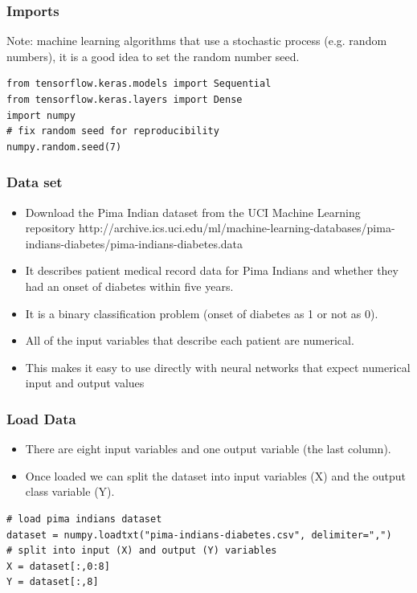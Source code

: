 \begin{frame}[fragile] \frametitle{Imports}
Note: machine learning algorithms that use a stochastic process (e.g. random numbers), it is a good idea to set the random number seed.
\begin{lstlisting}
from tensorflow.keras.models import Sequential
from tensorflow.keras.layers import Dense
import numpy
# fix random seed for reproducibility
numpy.random.seed(7)
\end{lstlisting}
\end{frame}

\begin{frame}[fragile] \frametitle{Data set}
 \begin{itemize}
 \item  Download the Pima Indian dataset from the UCI Machine Learning repository http://archive.ics.uci.edu/ml/machine-learning-databases/pima-indians-diabetes/pima-indians-diabetes.data 
\item  It describes patient medical record data for Pima Indians and whether they had an onset of diabetes within five years.
\item  It is a binary classification problem (onset of diabetes as 1 or not as 0). 
\item All of the input variables that describe each patient are numerical. 
\item This makes it easy to use directly with neural networks that expect numerical input and output values
\end{itemize}
\end{frame}

\begin{frame}[fragile] \frametitle{Load Data}
 \begin{itemize}
\item  There are eight input variables and one output variable (the last column).
\item Once loaded we can split the dataset into input variables (X) and the output class variable (Y).
\end{itemize}
\begin{lstlisting}
# load pima indians dataset
dataset = numpy.loadtxt("pima-indians-diabetes.csv", delimiter=",")
# split into input (X) and output (Y) variables
X = dataset[:,0:8]
Y = dataset[:,8]
\end{lstlisting}
\end{frame}

